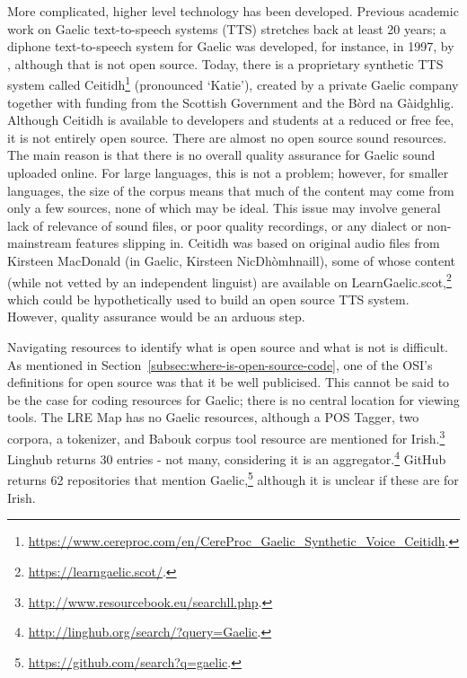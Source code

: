 More complicated, higher level technology has been developed. Previous academic work on Gaelic text-to-speech systems (TTS) stretches back at least 20 years; a diphone text-to-speech system for Gaelic was developed, for instance, in 1997, by \citet{wolters1997diphone}, although that is not open source. Today, there is a proprietary synthetic TTS system called Ceitidh\footnote{\href{https://www.cereproc.com/en/CereProc_Gaelic_Synthetic_Voice_Ceitidh}{https://www.cereproc.com/en/CereProc\_Gaelic\_Synthetic\_Voice\_Ceitidh}. } (pronounced `Katie'), created by a private Gaelic company together with funding from the Scottish Government and the B\`ord na G\`aidghlig. Although Ceitidh is available to developers and students at a reduced or free fee, it is not entirely open source. There are almost no open source sound resources. The main reason is that there is no overall quality assurance for Gaelic sound uploaded online. For large languages, this is not a problem; however, for smaller languages, the size of the corpus means that much of the content may come from only a few sources, none of which may be ideal. This issue may involve general lack of relevance of sound files, or poor quality recordings, or any dialect or non-mainstream features slipping in. Ceitidh was based on original audio files from Kirsteen MacDonald (in Gaelic, Kirsteen NicDh\`{o}mhnaill), some of whose content (while not vetted by an independent linguist) are available on LearnGaelic.scot,\footnote{\href{https://learngaelic.scot/}{https://learngaelic.scot/}. } which could be hypothetically used to build an open source TTS system. However, quality assurance would be an arduous step.

Navigating resources to identify what is open source and what is not is difficult. As mentioned in Section~\ref{subsec:where-is-open-source-code}, one of the OSI's definitions for open source was that it be well publicised. This cannot be said to be the case for coding resources for Gaelic; there is no central location for viewing tools. The LRE Map has no Gaelic resources, although a POS Tagger, two corpora, a tokenizer, and Babouk corpus tool resource are mentioned for Irish.\footnote{\href{http://www.resourcebook.eu/searchll.php}{http://www.resourcebook.eu/searchll.php}. } Linghub returns 30 entries - not many, considering it is an aggregator.\footnote{\href{http://linghub.org/search/?query=Gaelic}{http://linghub.org/search/?query=Gaelic}. } GitHub returns 62 repositories that mention Gaelic,\footnote{\href{https://github.com/search?q=gaelic}{https://github.com/search?q=gaelic}. } although it is unclear if these are for Irish.

